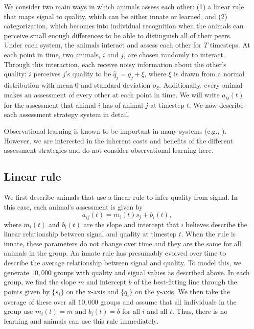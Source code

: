 We consider two main ways in which animals assess each other: (1) a linear rule that maps signal to quality, which can be either innate or learned, and (2) categorization, which becomes into individual recognition when the animals can perceive small enough differences to be able to distinguish all of their peers. Under each system, the animals interact and assess each other for $T$ timesteps. At each point in time, two animals, $i$ and $j$, are chosen randomly to interact. Through this interaction, each receive noisy information about the other's quality: $i$ perceives $j$'s quality to be $\hat{q}_j=q_j+\xi$, where $\xi$ is drawn from a normal distribution with mean $0$ and standard deviation $\sigma_\xi$.  Additionally, every animal makes an assessment of every other at each point in time. We will write $a_{ij}(t)$ for the assessment that animal $i$ has of animal $j$ at timestep $t$. We now describe each assessment strategy system in detail.

Observational learning is known to be important in many systems (e.g., \citep{Freeman:1985kl,Holekamp:1991nx,Schaik:2011oq,Hobson:2015uq,Seyfarth2015SocialCognition}). However, we are interested in the inherent costs and benefits of the different assessment strategies and do not consider observational learning here. 


\subsection*{Linear rule}
We first describe animals that use a linear rule to infer quality from signal. In this case, each animal's assessment is given by
\begin{equation*}
a_{ij}(t)=m_i(t)s_j+b_i(t),
\end{equation*}
where $m_i(t)$ and $b_i(t)$ are the slope and intercept that $i$ believes describe the linear relationship between signal and quality at timestep $t$. When the rule is innate, these parameters do not change over time and they are the same for all animals in the group. An innate rule has presumably evolved over time to describe the average relationship between signal and quality. To model this, we generate $10,000$ groups with quality and signal values as described above. In each group, we find the slope $m$ and intercept $b$ of the best-fitting line through the points given by $\{s_i\}$ on the x-axis and $\{q_i\}$ on the y-axis. We then take the average of these over all $10,000$ groups and assume that all individuals in the group use $m_i(t)=\bar{m}$ and $b_i(t)=\bar{b}$ for all $i$ and all $t$. Thus, there is no learning and animals can use this rule immediately. 

